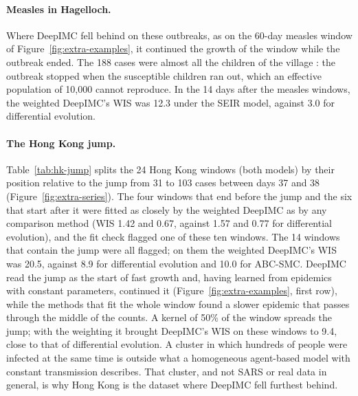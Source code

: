 \documentclass[12pt]{article}
\begin{document}
\paragraph{Measles in Hagelloch.} Where DeepIMC fell behind on these outbreaks, as on the 60-day measles window of
Figure~\ref{fig:extra-examples}, it continued the growth of the window while the outbreak ended. The 188 cases
were almost all the children of the village \autocite{neal2004statistical}: the outbreak stopped when the
susceptible children ran out, which an effective population of 10,000 cannot reproduce. In the 14 days after the
measles windows, the weighted DeepIMC's WIS was 12.3 under the SEIR model, against 3.0 for differential evolution.

\paragraph{The Hong Kong jump.} Table~\ref{tab:hk-jump} splits the 24 Hong Kong windows (both models) by their
position relative to the jump from 31 to 103 cases between days 37 and 38 (Figure~\ref{fig:extra-series}). The four
windows that end before the jump and the six that start after it were fitted as closely by the weighted DeepIMC as
by any comparison method (WIS 1.42 and 0.67, against 1.57 and 0.77 for differential evolution), and the fit check
flagged one of these ten windows. The 14 windows that contain the jump were all flagged; on them the weighted
DeepIMC's WIS was 20.5, against 8.9 for differential evolution and 10.0 for ABC-SMC. DeepIMC read the jump as the
start of fast growth and, having learned from epidemics with constant parameters, continued it
(Figure~\ref{fig:extra-examples}, first row), while the methods that fit the whole window found a slower epidemic
that passes through the middle of the counts. A kernel of 50\% of the window spreads the jump; with the weighting it
brought DeepIMC's WIS on these windows to 9.4, close to that of differential evolution. A cluster in which hundreds
of people were infected at the same time \autocite{yu2004evidence} is outside what a homogeneous agent-based model
with constant transmission describes. That cluster, and not SARS or real data in general, is why Hong Kong is the
dataset where DeepIMC fell furthest behind.

\begin{table}
\centering
\caption{Six more outbreaks, with Hong Kong SARS for comparison: coverage (\%) of the observed counts in the window
by the 95\% band, and WIS in the window and in the next 14 days (where the outbreak continues), mean over the
windows of each outbreak (number of windows per model in brackets). DeepIMC is shown on the raw counts, weighted by
the data, and weighted with the counts smoothed by a Gaussian kernel of 20\% or 50\% of the window length; every
version is scored against the raw counts. Bold: coverage closest to 95\% and lowest WIS.}
\label{tab:real-extra}
\footnotesize
\resizebox{\textheight}{!}{}
\end{table}
\end{document}
